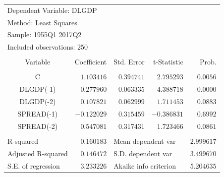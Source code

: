 \documentclass[12pt]{report}
\begin{document}
\vspace{-\baselineskip}
\begin{table}[H]
	\centering
	\begin{tabular}{lrrrr}
		\multicolumn{3}{l}{Dependent Variable: DLGDP}&\multicolumn{1}{c}{}&\multicolumn{1}{c}{}\\
		\multicolumn{3}{l}{Method: Least Squares}&\multicolumn{1}{c}{}&\multicolumn{1}{c}{}\\
		\multicolumn{3}{l}{Sample: 1955Q1 2017Q2}&\multicolumn{1}{c}{}&\multicolumn{1}{c}{}\\
		\multicolumn{3}{l}{Included observations: 250}&\multicolumn{1}{c}{}&\multicolumn{1}{c}{}\\
		[4.5pt] \hline \\ [-4.5pt]
		\multicolumn{1}{c}{Variable}&\multicolumn{1}{r}{Coefficient}&\multicolumn{1}{r}{Std. Error}&\multicolumn{1}{r}{t-Statistic}&\multicolumn{1}{r}{Prob.}\\
		[4.5pt] \hline \\ [-4.5pt]
		\multicolumn{1}{c}{C}&\multicolumn{1}{r}{$1.103416$}&\multicolumn{1}{r}{$0.394741$}&\multicolumn{1}{r}{$2.795293$}&\multicolumn{1}{r}{$0.0056$}\\
		\multicolumn{1}{c}{DLGDP(-1)}&\multicolumn{1}{r}{$0.277960$}&\multicolumn{1}{r}{$0.063335$}&\multicolumn{1}{r}{$4.388718$}&\multicolumn{1}{r}{$0.0000$}\\
		\multicolumn{1}{c}{DLGDP(-2)}&\multicolumn{1}{r}{$0.107821$}&\multicolumn{1}{r}{$0.062999$}&\multicolumn{1}{r}{$1.711453$}&\multicolumn{1}{r}{$0.0883$}\\
		\multicolumn{1}{c}{SPREAD(-1)}&\multicolumn{1}{r}{$-0.122029$}&\multicolumn{1}{r}{$0.315459$}&\multicolumn{1}{r}{$-0.386831$}&\multicolumn{1}{r}{$0.6992$}\\
		\multicolumn{1}{c}{SPREAD(-2)}&\multicolumn{1}{r}{$0.547081$}&\multicolumn{1}{r}{$0.317431$}&\multicolumn{1}{r}{$1.723466$}&\multicolumn{1}{r}{$0.0861$}\\
		[4.5pt] \hline \\ [-4.5pt]
		\multicolumn{1}{l}{R-squared}&\multicolumn{1}{r}{$0.160183$}&\multicolumn{2}{l}{Mean dependent var}&\multicolumn{1}{r}{$2.999617$}\\
		\multicolumn{1}{l}{Adjusted R-squared}&\multicolumn{1}{r}{$0.146472$}&\multicolumn{2}{l}{S.D. dependent var}&\multicolumn{1}{r}{$3.499670$}\\
		\multicolumn{1}{l}{S.E. of regression}&\multicolumn{1}{r}{$3.233226$}&\multicolumn{2}{l}{Akaike info criterion}&\multicolumn{1}{r}{$5.204635$}\\

\end{tabular}
\end{table}
\end{document}
